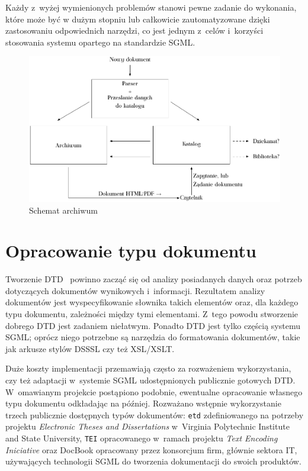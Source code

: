 \documentclass[brudnopis]{xmgr}
\begin{document}
Każdy z~wyżej wymienionych problemów stanowi pewne zadanie do
wykonania, które może być w dużym stopniu lub całkowicie
zautomatyzowane dzięki zastosowaniu odpowiednich narzędzi, co jest
jednym z~celów i~korzyści stosowania systemu opartego na standardzie
SGML.

\begin{figure}[!tbh]
\centering 
\includegraphics[width=.8\hsize]{fig/schemat}
\caption{Schemat archiwum\label{RYS.2}}
\end{figure}

\section{Opracowanie typu dokumentu\label{s:dtd}}
Tworzenie DTD~\cite{Eisenberg:2002:SXM,Goldfarb:2002:CFG} powinno zacząć się
od analizy posiadanych danych oraz potrzeb dotyczących dokumentów
wynikowych i~informacji. Rezultatem analizy dokumentów jest
wyspecyfikowanie słownika takich elementów oraz, dla każdego typu
dokumentu, zależności między tymi elementami. Z~tego powodu stworzenie
dobrego DTD jest zadaniem niełatwym. Ponadto DTD jest tylko częścią
systemu SGML; oprócz niego potrzebne są narzędzia do formatowania
dokumentów, takie jak arkusze stylów DSSSL czy też XSL/XSLT.
    
Duże koszty implementacji przemawiają często za rozważeniem
wykorzystania, czy też adaptacji w~systemie SGML udostępnionych
publicznie gotowych DTD. W~omawianym projekcie postąpiono podobnie,
ewentualne opracowanie własnego typu dokumentu odkładając na później.
Rozważano wstępnie wykorzystanie trzech publicznie dostępnych typów
dokumentów: \texttt{etd} zdefiniowanego na potrzeby projektu
\textit{Electronic Theses and Dissertations} w~Virginia Polytechnic
Institute and State University, \texttt{TEI} opracowanego w~ramach
projektu \textit{Text Encoding Iniciative} oraz
DocBook opracowany przez konsorcjum firm, głównie sektora IT,
używających technologii SGML do tworzenia dokumentacji do swoich
produktów.
    
\end{document}
